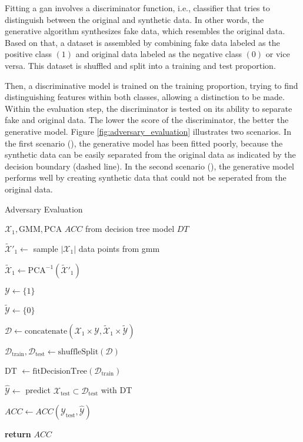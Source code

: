 \documentclass[../../main.tex]{subfiles}
\begin{document}
Fitting a \gls{gan} involves a discriminator function, i.e., classifier that tries to distinguish between the original and synthetic data. In other words, the generative algorithm synthesizes fake data, which resembles the original data. Based on that, a dataset is assembled by combining fake data labeled as the positive class $(1)$ and original data labeled as the negative class $(0)$ or vice versa. This dataset is shuffled and split into a training and test proportion.

Then, a discriminative model is trained on the training proportion, trying to find distinguishing features within both classes, allowing a distinction to be made. Within the evaluation step, the discriminator is tested on its ability to separate fake and original data. The lower the score of the discriminator, the better the generative model. Figure \ref{fig:adversary_evaluation} illustrates two scenarios. In the first scenario (), the generative model has been fitted poorly, because the synthetic data can be easily separated from the original data as indicated by the decision boundary (dashed line). In the second scenario (), the generative model performs well by creating synthetic data that could not be seperated from the original data. 

\begin{algorithm}
    \caption{Adversary Evaluation}
    \label{alg:adversary_evaluation}
    \begin{algorithmic}[1]
        \REQUIRE $\mathcal{X}_1, \text{GMM}, \text{PCA}$
        \ENSURE $ACC$ from decision tree model $DT$

        \STATE $\tilde{\mathcal{X}}'_1 \leftarrow$ sample $|\mathcal{X}_1|$ data points from \gls{gmm}

        \STATE $\tilde{\mathcal{X}}_1 \leftarrow \text{PCA}^{-1}(\tilde{\mathcal{X}}'_1)$ 

        \STATE $\mathcal{Y} \leftarrow \{ 1 \}$
        
        \STATE $\tilde{\mathcal{Y}} \leftarrow \{ 0 \}$

        \STATE $\mathcal{D} \leftarrow \text{concatenate}(\mathcal{X}_1 \times \mathcal{Y}, \tilde{\mathcal{X}}_1 \times \tilde{\mathcal{Y}})$
        
        \STATE $\mathcal{D}_{\text{train}}, \mathcal{D}_{\text{test}} \leftarrow \text{shuffleSplit}(\mathcal{D})$

        \STATE DT $\leftarrow \text{fitDecisionTree}(\mathcal{D}_{\text{train}})$

        \STATE $\hat{\mathcal{Y}} \leftarrow$ predict $\mathcal{X}_{\text{test}} \subset \mathcal{D}_{\text{test}}$ with DT

        \STATE $ACC \leftarrow ACC(\mathcal{Y}_{\text{test}}, \hat{\mathcal{Y}})$

        \STATE \textbf{return} $ACC$
    \end{algorithmic}
 \end{algorithm}
\end{document}
